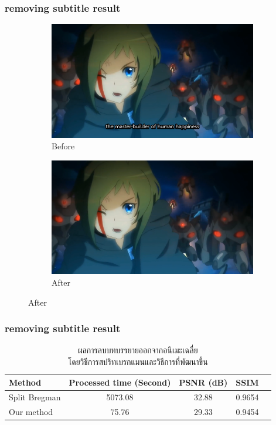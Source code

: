 \documentclass[xcolor=dvipsnames, xetex,serif]{beamer}
\begin{document}
    \begin{frame}
        \frametitle{removing subtitle result}
        \begin{figure}[H]
            \centering
            \begin{subfigure}{0.4\linewidth}
                \centering
                \includegraphics[width=0.80\linewidth]{images/subtitle-remove/beforesubtitleremove.png}
                \caption{Before}
            \end{subfigure}
            \begin{subfigure}{0.4\linewidth}
                \centering
                \includegraphics[width=0.80\linewidth]{images/subtitle-remove/aftersubtitleremove.png}
                \caption{After}
            \end{subfigure}
        \end{figure}
    \end{frame}
    \begin{frame}
        \frametitle{removing subtitle result}
        \begin{table}[H]
            \centering
            \captionsetup{justification=centering}
            \begin{tabular}[ht]{|l|c|c|c|c|}
                \hline
                Method  & Processed time  (Second) & PSNR (dB) & SSIM \\
                \hline
                Split Bregman & 5073.08 & 32.88 & 0.9654 \\
                Our method & 75.76 & 29.33 & 0.9454 \\
                \hline
            \end{tabular}
            \caption{ผลการลบบทบรรยายออกจากอนิเมะเฉลี่ย\\โดยวิธีการสปริทเบรกแมนและวิธีการที่พัฒนาขึ้น}
        \end{table}	
    \end{frame}
\end{document}
